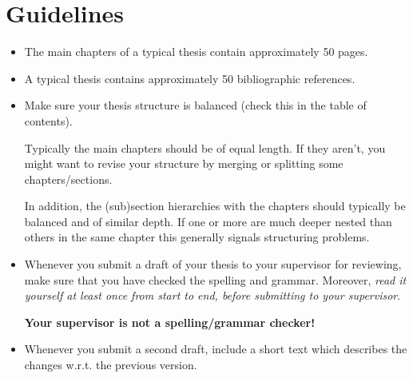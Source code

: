 \section{Guidelines}

\begin{itemize}

\item The main chapters of a typical thesis contain approximately 50
  pages.

\item A typical thesis contains approximately 50 bibliographic
  references.

\item Make sure your thesis structure is balanced (check this in the
  table of contents). 

  Typically the main chapters should be of equal length. If they aren't,
  you might want to revise your structure by merging or splitting some
  chapters/sections.

  In addition, the (sub)section hierarchies with the chapters should
  typically be balanced and of similar depth. If one or more are much
  deeper nested than others in the same chapter this generally signals
  structuring problems.

\item Whenever you submit a draft of your thesis to your supervisor
  for reviewing, make sure that you have checked the spelling and
  grammar.  Moreover, \emph{read it yourself at least once from start
  to end, before submitting to your supervisor}.

  \textbf{Your supervisor is not a spelling/grammar checker!}

\item Whenever you submit a second draft, include a short text which
  describes the changes w.r.t. the previous version. 

\end{itemize}



